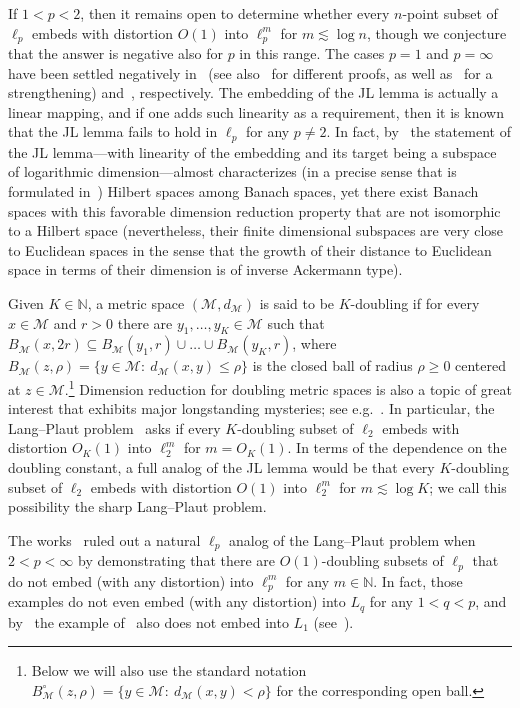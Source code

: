 \documentclass[11pt,reqno]{amsart}
\newcommand{\N}{\mathbb{N}}
\renewcommand{\le}{\leqslant}
\renewcommand{\ge}{\geqslant}
\renewcommand{\subset}{\subseteq}
\newcommand{\MM}{\mathcal{M}}
\newcommand{\1}{\mathbf{1}}
\begin{document}
If $1<p<2$, then it remains open to determine whether every $n$-point subset of $\ell_p$ embeds with distortion $O(1)$ into $\ell_p^m$ for $m\lesssim \log n$, though we conjecture that the answer is negative also for $p$ in this range. The cases $p=1$ and $p=\infty$ have been settled negatively in~\cite{BC03} (see also~\cite{LeeNaor,Regev} for different proofs, as well as~\cite{ACNN} for a strengthening) and~\cite{AR92,Mat96,RV,LMN,Rab08,Nao17}, respectively.  The embedding of the JL lemma is actually a linear mapping, and if one adds such linearity as a requirement, then it is known~\cite{CS02,LMN} that the JL lemma fails to hold in $\ell_p$ for any $p\neq 2$. In fact, by~\cite{JN09} the statement of the JL lemma---with linearity of the embedding and its target being a subspace of logarithmic dimension---almost characterizes (in a precise sense that is formulated in~\cite{JN09}) Hilbert spaces among Banach spaces, yet there exist Banach spaces with this favorable dimension reduction property that are not isomorphic to a Hilbert space (nevertheless, their finite dimensional subspaces are very close to Euclidean spaces in the sense that the growth of their distance to Euclidean space in terms of their dimension is of inverse Ackermann type).  


Given $K\in \N$, a metric space $(\MM,d_\MM)$ is said to be $K$-doubling if for every $x\in \MM$ and  $r>0$ there are $y_1,\ldots,y_K\in \MM$ such that $B_\MM(x,2r)\subset B_\MM(y_1,r)\cup\ldots\cup B_\MM(y_K,r)$, where $B_\MM(z,\rho)=\{y\in \MM:\ d_\MM(x,y)\le \rho\}$ is the closed ball of radius $\rho\ge 0$ centered at $z\in \MM$.\footnote{Below we will also use the standard notation $B_\MM^\circ(z,\rho)=\{y\in \MM:\ d_\MM(x,y)< \rho\}$  for the corresponding open ball.} Dimension reduction for doubling metric spaces is also a topic of great interest that exhibits major longstanding mysteries; see e.g.~\cite[Section~3]{Naor-ribe}. In particular, the  Lang--Plaut problem~\cite{LP01} asks if every $K$-doubling subset of $\ell_2$ embeds with distortion $O_K(1)$ into $\ell_2^m$ for $m=O_K(1)$. In terms of the dependence on the doubling constant, a full analog of the JL lemma would be that every $K$-doubling subset of $\ell_2$ embeds with distortion $O(1)$ into $\ell_2^m$ for $m\lesssim \log K$; we call this possibility the { sharp Lang--Plaut problem}. 

The works~\cite{BGN14,LN} ruled out a natural $\ell_p$ analog of the Lang--Plaut problem when $2<p<\infty$ by demonstrating that there are $O(1)$-doubling subsets of $\ell_p$ that do not embed (with any distortion) into $\ell_p^m$ for any $m\in \N$. In fact, those examples do not even embed (with any distortion) into $L_q$ for any $1<q<p$, and by~\cite{NY17} the example of~\cite{LN} also does not embed into $L_1$ (see~\cite[Remark~8]{NY18}).
\end{document}
